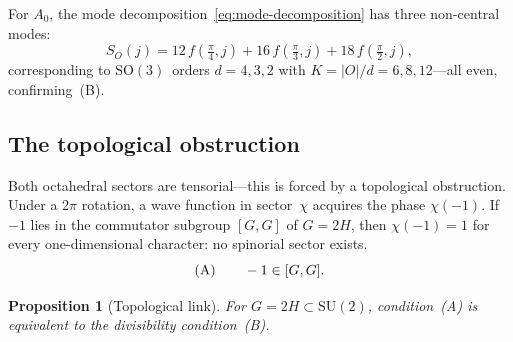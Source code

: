 \documentclass[12pt]{article}
\newtheorem{proposition}[theorem]{Proposition}
\theoremstyle{definition}
\theoremstyle{remark}
\newcommand{\SU}{\mathrm{SU}}
\newcommand{\SO}{\mathrm{SO}}
\begin{document}
\noindent
For $A_0$, the
mode decomposition~\eqref{eq:mode-decomposition}
has three non-central modes:
\begin{equation}
  \label{eq:collapsed-O}
  S_O(j)
  = 12\,f(\tfrac{\pi}{4}, j)
  + 16\,f(\tfrac{\pi}{3}, j)
  + 18\,f(\tfrac{\pi}{2}, j),
\end{equation}
corresponding to $\SO(3)$~orders
$d = 4, 3, 2$ with $K = |O|/d = 6, 8, 12$---all even,
confirming~(B).

\subsection{The topological obstruction}
\label{sec:topological}

Both octahedral sectors are tensorial---this is forced
by a topological obstruction.
Under a $2\pi$ rotation, a wave function in sector~$\chi$
acquires the phase $\chi(-1)$.
If $-1$ lies in the commutator subgroup
$[G,G]$ of $G = 2H$, then $\chi(-1) = 1$ for every
one-dimensional character: no spinorial sector exists.
\begin{equation}
  \label{eq:obstruction-A}
  \textup{(A)}\qquad -1 \in [G,G].
\end{equation}

\begin{proposition}[Topological link]
  \label{prop:A-iff-B}
  For $G = 2H \subset \SU(2)$, condition~\textup{(A)}
  is equivalent to the divisibility
  condition~\textup{(B)}.
\end{proposition}
\end{document}
